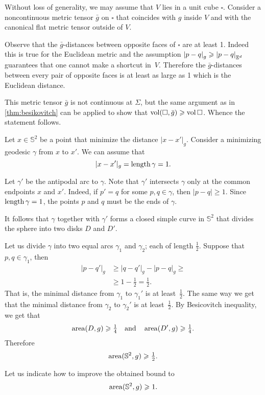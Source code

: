Without loss of generality, we may assume that $V$ lies in a unit cube $\square$.
Consider a noncontinuous metric tensor $\bar g$ on $\square$ that coincides with $g$ inside $V$ and with the canonical flat metric tensor outside of $V$.

Observe that the $\bar g$-distances between opposite faces of $\square$ are at least 1.
Indeed this is true for the Euclidean metric and the assumption $\dist{p}{q}{g}\ge\dist{p}{q}{\EE^d}$  guarantees that one cannot make a shortcut in~$V$.
Therefore the $\bar g$-distances between every pair of opposite faces is at least as large as 1 which is the Euclidean distance.

This metric tensor $\bar g$ is not continuous at $\Sigma$, but the same argument as in \ref{thm:besikovitch} can be applied to show that $\operatorname{\rm vol}\nolimits(\square,\bar g)\geqslant \operatorname{\rm vol}\nolimits\square$.
Whence the statement follows.


Let $x\in \mathbb{S}^2$ be a point that minimize the distance $|x-x'|_g$.
Consider a minimizing geodesic $\gamma$ from $x$ to $x'$.
We can assume that 
\[|x-x'|_g=\mathop{\rm length}\nolimits \gamma=1.\]

Let $\gamma'$ be the antipodal arc to $\gamma$.
Note that $\gamma'$ intersects $\gamma$ only at the common endpoints $x$ and $x'$.
Indeed, if $p'=q$ for some $p,q\in\gamma$, then $|p-q|\ge 1$.
Since $\mathop{\rm length}\nolimits \gamma=1$, the points $p$ and $q$ must be the ends of $\gamma$.

It follows that $\gamma$ together with $\gamma'$ forms a closed simple curve in $\mathbb{S}^2$
that divides the sphere into two disks $D$ and $D'$.

Let us divide $\gamma$ into two equal arcs $\gamma_1$ and $\gamma_2$; each of length $\tfrac12$.
Suppose that $p,q\in\gamma_1$, then 
\begin{align*}
|p-q'|_g&\ge |q-q'|_g-|p-q|_g\ge
\\
&\ge 1-\tfrac12=\tfrac12.
\end{align*}
That is, the minimal distance from $\gamma_1$ to $\gamma_1'$ is at least~$\tfrac12$.
The same way we get that the minimal distance from $\gamma_2$ to $\gamma_2'$ is at least~$\tfrac12$.
By Besicovitch inequality, we get that 
\[\operatorname{\rm area}\nolimits(D,g)\geqslant \tfrac14\quad\text{and}\quad \operatorname{\rm area}\nolimits(D',g)\geqslant \tfrac14.\]
Therefore 
\[\operatorname{\rm area}\nolimits(\mathbb{S}^2,g)\geqslant\tfrac12.\]

Let us indicate how to improve the obtained bound to
\[\operatorname{\rm area}\nolimits(\mathbb{S}^2,g)\geqslant1.\]

